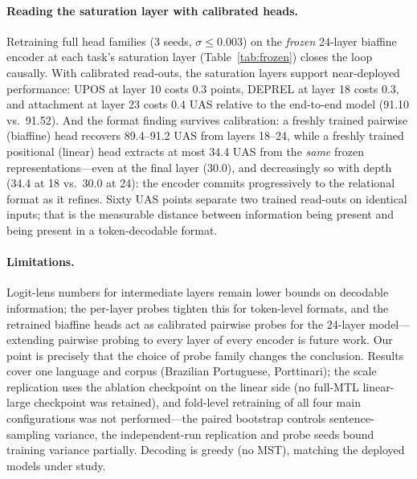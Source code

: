 \paragraph{Reading the saturation layer with calibrated heads.}
Retraining full head families (3 seeds, $\sigma \leq 0.003$) on the
\emph{frozen} 24-layer biaffine encoder at each task's saturation layer
(Table~\ref{tab:frozen}) closes the loop causally. With calibrated read-outs,
the saturation layers support near-deployed performance: UPOS at layer 10
costs 0.3 points, DEPREL at layer 18 costs 0.3, and attachment at layer 23
costs 0.4 UAS relative to the end-to-end model (91.10 vs.\ 91.52). And the
format finding survives calibration: a freshly trained pairwise (biaffine)
head recovers 89.4--91.2 UAS from layers 18--24, while a freshly trained
positional (linear) head extracts at most 34.4 UAS from the \emph{same}
frozen representations---even at the final layer (30.0), and decreasingly so
with depth (34.4 at 18 vs.\ 30.0 at 24): the encoder commits progressively to
the relational format as it refines. Sixty UAS points separate two trained
read-outs on identical inputs; that is the measurable distance between
information being present and being present in a token-decodable format.

\paragraph{Limitations.}
Logit-lens numbers for intermediate layers remain lower bounds on decodable
information; the per-layer probes tighten this for token-level formats, and
the retrained biaffine heads act as calibrated pairwise probes for the
24-layer model---extending pairwise probing to every layer of every encoder
is future work. Our point is precisely that the choice of probe family
changes the conclusion.
Results cover one language and corpus (Brazilian Portuguese, Porttinari); the
scale replication uses the ablation checkpoint on the linear side (no
full-MTL linear-large checkpoint was retained), and fold-level retraining of
all four main configurations was not performed---the paired bootstrap
controls sentence-sampling variance, the independent-run replication and
probe seeds bound training variance partially. Decoding is greedy (no MST),
matching the deployed models under study.

